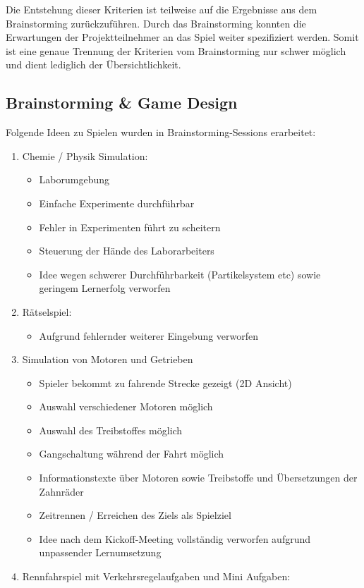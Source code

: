 Die Entstehung dieser Kriterien ist teilweise auf die Ergebnisse aus dem Brainstorming zurückzuführen. Durch das Brainstorming konnten die Erwartungen der Projektteilnehmer an das Spiel weiter spezifiziert werden. Somit ist eine genaue Trennung der Kriterien vom Brainstorming nur schwer möglich und dient lediglich der Übersichtlichkeit.

\subsection{Brainstorming \& Game Design}\label{ssec:idee}
	Folgende Ideen zu Spielen wurden in Brainstorming-Sessions erarbeitet:
\begin{enumerate}
	\item Chemie / Physik Simulation:
	\begin{itemize}
		\item Laborumgebung
		\item Einfache Experimente durchführbar
		\item Fehler in Experimenten führt zu scheitern
		\item Steuerung der Hände des Laborarbeiters
		\item Idee wegen schwerer Durchführbarkeit (Partikelsystem etc) sowie geringem Lernerfolg verworfen
	\end{itemize}
	\item Rätselspiel:
	\begin{itemize}
		\item Aufgrund fehlernder weiterer Eingebung verworfen
	\end{itemize}
	\item Simulation von Motoren und Getrieben
	\begin{itemize}
		\item Spieler bekommt zu fahrende Strecke gezeigt (2D Ansicht)
		\item Auswahl verschiedener Motoren möglich
		\item Auswahl des Treibstoffes möglich
		\item Gangschaltung während der Fahrt möglich
		\item Informationstexte über Motoren sowie Treibstoffe und Übersetzungen der Zahnräder
		\item Zeitrennen / Erreichen des Ziels als Spielziel
		\item Idee nach dem Kickoff-Meeting vollständig verworfen aufgrund unpassender Lernumsetzung
	\end{itemize}
	\item Rennfahrspiel mit Verkehrsregelaufgaben und Mini Aufgaben:

\end{enumerate}
